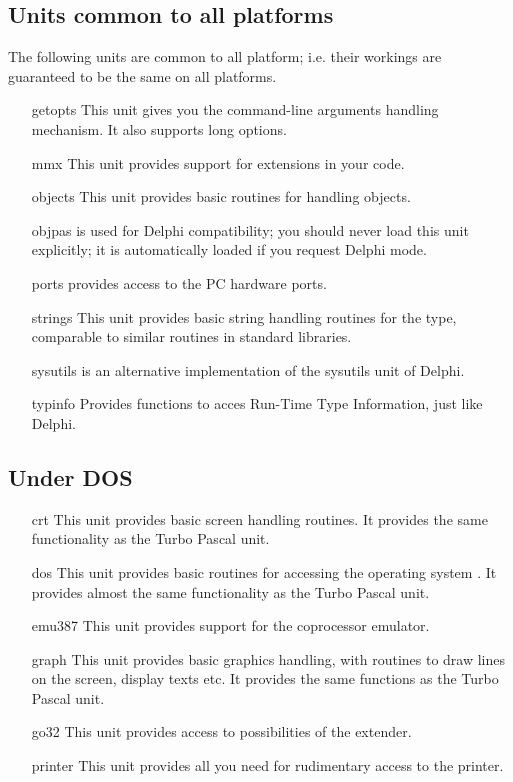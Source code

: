 \documentclass{report}
\begin{document}
%
%
\subsection{Units common to all platforms}
The following units are common to all platform; i.e. their workings
are guaranteed to be the same on all platforms.
\begin{itemize}
\item [getopts] This unit gives you the \gnu {} command-line
arguments  handling mechanism. It also supports long options.
\item [mmx] This unit provides support for  extensions in your
code.
\item [objects]  This unit provides basic routines for handling objects.
\item [objpas] is used for Delphi compatibility; you should never load this
unit explicitly; it is automatically loaded if you request Delphi mode.
\item [ports] provides access to the PC hardware ports.
\item [strings] This unit provides basic string handling routines for the
 type, comparable to similar routines in standard 
libraries.
\item[sysutils] is an alternative implementation of the sysutils unit of
Delphi.
\item[typinfo] Provides functions to acces Run-Time Type Information, just
like Delphi.
\end{itemize}

%
%
\subsection{Under DOS}
\begin{itemize}
\item [crt] This unit provides basic screen handling routines.
It provides the same functionality  as the Turbo Pascal  unit.
\item [dos] This unit provides basic routines for accessing the operating
system \dos. It provides almost the same functionality as the Turbo Pascal
unit.
\item [emu387] This unit provides support for the coprocessor emulator.
\item [graph] This unit provides basic graphics handling, with routines to
draw lines on the screen, display texts etc. It provides the same functions
as the Turbo Pascal unit.
\item [go32] This unit provides access to possibilities of the 
\dos extender.
\item [printer]  This unit provides all you need for rudimentary access
to the printer.
\end{itemize}
\end{document}
